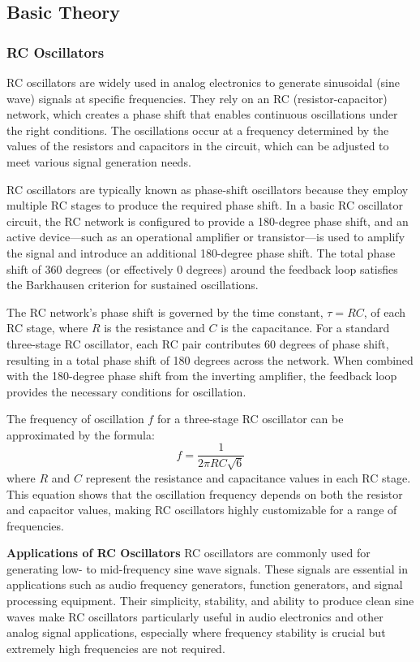\documentclass[12pt,a4paper]{article}
\begin{document}
    \subsection{Basic Theory}

    \subsubsection{RC Oscillators}
    RC oscillators are widely used in analog electronics to generate sinusoidal (sine wave) signals at specific frequencies. They rely on an RC (resistor-capacitor) network, which creates a phase shift that enables continuous oscillations under the right conditions. The oscillations occur at a frequency determined by the values of the resistors and capacitors in the circuit, which can be adjusted to meet various signal generation needs.

    RC oscillators are typically known as phase-shift oscillators because they employ multiple RC stages to produce the required phase shift. In a basic RC oscillator circuit, the RC network is configured to provide a 180-degree phase shift, and an active device—such as an operational amplifier or transistor—is used to amplify the signal and introduce an additional 180-degree phase shift. The total phase shift of 360 degrees (or effectively 0 degrees) around the feedback loop satisfies the Barkhausen criterion for sustained oscillations.

    The RC network’s phase shift is governed by the time constant, \( \tau = RC \), of each RC stage, where \( R \) is the resistance and \( C \) is the capacitance. For a standard three-stage RC oscillator, each RC pair contributes 60 degrees of phase shift, resulting in a total phase shift of 180 degrees across the network. When combined with the 180-degree phase shift from the inverting amplifier, the feedback loop provides the necessary conditions for oscillation.

    The frequency of oscillation \( f \) for a three-stage RC oscillator can be approximated by the formula:
    \[
    f = \frac{1}{2 \pi R C \sqrt{6}}
    \]
    where \( R \) and \( C \) represent the resistance and capacitance values in each RC stage. This equation shows that the oscillation frequency depends on both the resistor and capacitor values, making RC oscillators highly customizable for a range of frequencies.

    \textbf{Applications of RC Oscillators}
    RC oscillators are commonly used for generating low- to mid-frequency sine wave signals. These signals are essential in applications such as audio frequency generators, function generators, and signal processing equipment. Their simplicity, stability, and ability to produce clean sine waves make RC oscillators particularly useful in audio electronics and other analog signal applications, especially where frequency stability is crucial but extremely high frequencies are not required.
\end{document}
